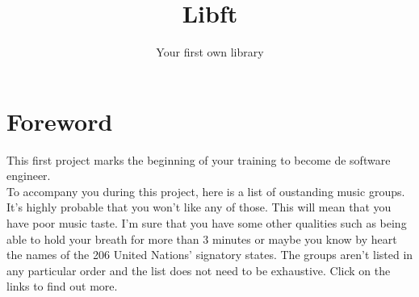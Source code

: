 \documentclass{42-en}
\begin{document}
                              \title{Libft}
          \subtitle{Your first own library}


    \maketitle

    \tableofcontents

\newpage
\chapter{Foreword}

    This first project marks the beginning of your training
    to become de software engineer.\\

    To accompany you during this project, here is a list of
    oustanding music groups. It's highly probable that you won't
    like any of those. This will mean that you have poor music taste.
    I'm sure that you have some other qualities such as being able to
    hold your breath for more than 3 minutes or maybe you know by
    heart the names of the 206 United Nations' signatory states.
    The groups aren't listed in any particular order and
    the list does not need to be exhaustive. Click on the links
    to find out more.\\
\end{document}
